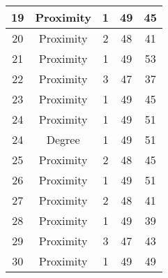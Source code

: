 \documentclass[results.tex]{subfiles}
\begin{document}
\begin{center}
\begin{tabular}{| c || c | c | c | c |}
            \hline
            19                      & Proximity                    & 1                      & 49                      & 45                   \\
            \hline
            20                      & Proximity                    & 2                      & 48                      & 41                   \\
            \hline
            21                      & Proximity                    & 1                      & 49                      & 53                   \\
            \hline
            22                      & Proximity                    & 3                      & 47                      & 37                   \\
            \hline
            23                      & Proximity                    & 1                      & 49                      & 45                   \\
            \hline
            24                      & Proximity                    & 1                      & 49                      & 51                   \\
            \hline
            24                      & Degree                       & 1                      & 49                      & 51                   \\
            \hline
            25                      & Proximity                    & 2                      & 48                      & 45                   \\
            \hline
            26                      & Proximity                    & 1                      & 49                      & 51                   \\
            \hline
            27                      & Proximity                    & 2                      & 48                      & 41                   \\
            \hline
            28                      & Proximity                    & 1                      & 49                      & 39                   \\
            \hline
            29                      & Proximity                    & 3                      & 47                      & 43                   \\
            \hline
            30                      & Proximity                    & 1                      & 49                      & 49                   \\

\end{tabular}
\end{center}
\end{document}
